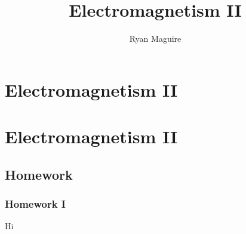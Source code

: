 \documentclass[crop=false,class=book,oneside]{standalone}
\begin{document}
    \ifx\ifphysicscourses\undefined
        \newif\ifsub
        \title{Electromagnetism II}
        \author{Ryan Maguire}
        \date{\vspace{-5ex}}
        \maketitle
        \tableofcontents
        \chapter*{Electromagnetism II}
        \setcounter{chapter}{1}
    \else
        \chapter{Electromagnetism II}
    \fi
\section{Homework}
\subsection{Homework I}
Hi
\end{document}
